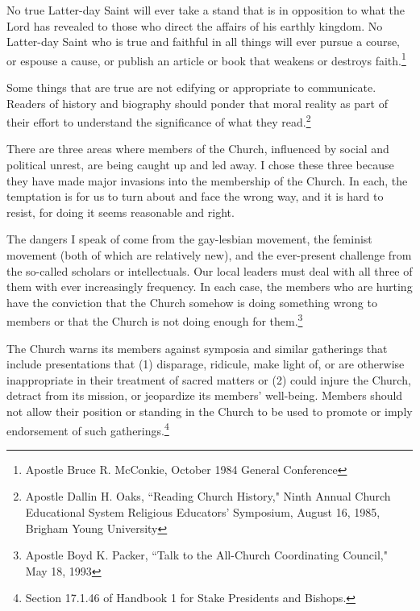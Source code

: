 \begin{displayquote}
No true Latter-day Saint will ever take a stand that is in opposition to what the 
Lord has revealed to those who direct the affairs of his earthly kingdom. No 
Latter-day Saint who is true and faithful in all things will ever pursue a course, 
or espouse a cause, or publish an article or book that weakens or destroys 
faith.\footnote{Apostle Bruce R. McConkie, October 1984 General Conference}
\end{displayquote}

\begin{displayquote}
Some things that are true are not edifying or appropriate to communicate. Readers 
of history and biography should ponder that moral reality as part of their effort to 
understand the significance of what they read.\footnote{Apostle Dallin H. Oaks, 
``Reading Church History," Ninth Annual Church Educational System Religious 
Educators' Symposium, August 16, 1985, Brigham Young University}
\end{displayquote}

\begin{displayquote}
There are three areas where members of the Church, influenced by social and political
unrest, are being caught up and led away. I chose these three because they have made
major invasions into the membership of the Church. In each, the temptation is for us
to turn about and face the wrong way, and it is hard to resist, for doing it seems
reasonable and right.

The dangers I speak of come from the gay-lesbian movement, the feminist movement
(both of which are relatively new), and the ever-present challenge from the so-called
scholars or intellectuals. Our local leaders must deal with all three of them with
ever increasingly frequency. In each case, the members who are hurting have the
conviction that the Church somehow is doing something wrong to members or that the
Church is not doing enough for them.\footnote{Apostle Boyd K. Packer, 
``Talk to the All-Church Coordinating Council," May 18, 1993}
\end{displayquote}

\begin{displayquote}
The Church warns its members against symposia and similar gatherings that include
presentations that (1) disparage, ridicule, make light of, or are otherwise
inappropriate in their treatment of sacred matters or (2) could injure the Church,
detract from its mission, or jeopardize its members' well-being. Members should not
allow their position or standing in the Church to be used to promote or imply
endorsement of such gatherings.\footnote{Section 17.1.46 of Handbook 1 for Stake 
Presidents and Bishops.}
\end{displayquote}

